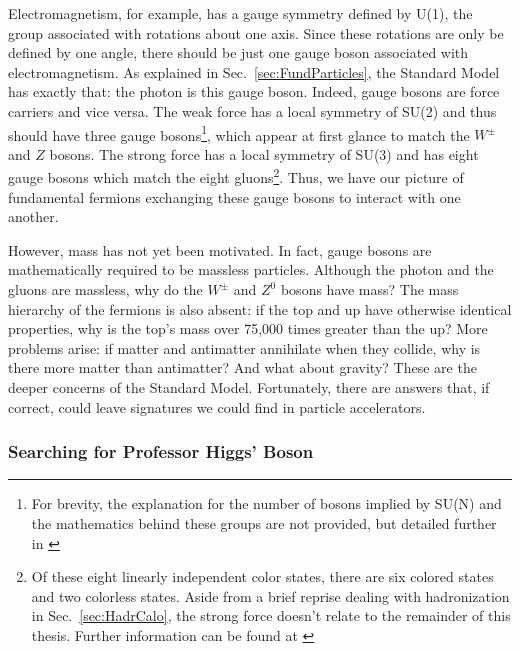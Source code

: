 Electromagnetism, for example, has a gauge symmetry defined by U(1), the group associated with rotations about one axis. Since these rotations are only be defined by one angle, there should be just one gauge boson associated with electromagnetism. As explained in Sec.~\ref{sec:FundParticles}, the Standard Model has exactly that: the photon is this gauge boson. Indeed, gauge bosons are force carriers and vice versa. The weak force has a local symmetry of SU(2) and thus should have three gauge bosons\footnote{For brevity, the explanation for the number of bosons implied by SU(N) and the mathematics behind these groups are not provided, but detailed further in \cite{Georgi:1999}}, which appear at first glance to match the $W^{\pm}$ and $Z$ bosons. The strong force has a local symmetry of SU(3) and has eight gauge bosons which match the eight gluons\footnote{Of these eight linearly independent color states, there are six colored states and two colorless states. Aside from a brief reprise dealing with hadronization in Sec.~\ref{sec:HadrCalo}, the strong force doesn't relate to the remainder of this thesis. Further information can be found at \cite{QCD:2007}}. Thus, we have our picture of fundamental fermions exchanging these gauge bosons to interact with one another.

However, mass has not yet been motivated. In fact, gauge bosons are mathematically required to be massless particles. Although the photon and the gluons are massless, why do the $W^{\pm}$ and $Z^{0}$ bosons have mass? The mass hierarchy of the fermions is also absent: if the top and up have otherwise identical properties, why is the top's mass over 75,000 times greater than the up? More problems arise: if matter and antimatter annihilate when they collide, why is there more matter than antimatter? And what about gravity? These are the deeper concerns of the Standard Model. Fortunately, there are answers that, if correct, could leave signatures we could find in particle accelerators.

\subsubsection{Searching for Professor Higgs' Boson}
\label{sec:findinghiggs}

